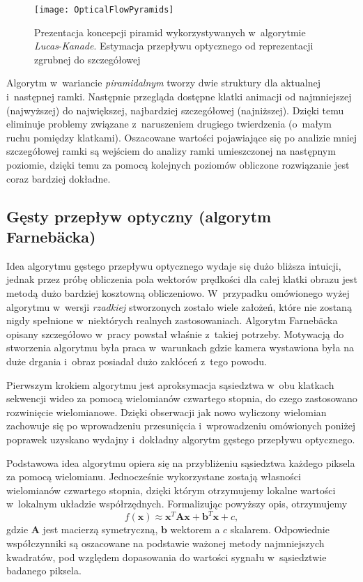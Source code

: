     \begin{figure}[!ht]
      \centering
      \texttt{[image: OpticalFlowPyramids]}
      \caption[Prezentacja koncepcji piramid wykorzystywanych w~algorytmie \textit{Lucas}-\textit{Kanade}]{Prezentacja koncepcji piramid wykorzystywanych w~algorytmie \textit{Lucas}-\textit{Kanade}. Estymacja przepływu optycznego od reprezentacji zgrubnej do szczegółowej}
      \label{fig:OpticalFlowPyramids}
    \end{figure}

    Algorytm w~wariancie \textit{piramidalnym} tworzy dwie struktury dla aktualnej i~następnej ramki. Następnie przegląda dostępne klatki animacji od najmniejszej (najwyższej) do największej, najbardziej szczegółowej (najniższej). Dzięki temu eliminuje problemy związane z~naruszeniem drugiego twierdzenia (o~małym ruchu pomiędzy klatkami). Oszacowane wartości pojawiające się po analizie mniej szczegółowej ramki są wejściem do analizy ramki umieszczonej na następnym poziomie, dzięki temu za pomocą kolejnych poziomów obliczone rozwiązanie jest coraz bardziej dokładne.

    \subsection{Gęsty przepływ optyczny (algorytm Farnebäcka)}\label{Subsection_DenseOpticalFlow}
    Idea algorytmu gęstego przepływu optycznego wydaje się dużo bliższa intuicji, jednak przez próbę obliczenia pola wektorów prędkości dla całej klatki obrazu jest metodą dużo bardziej kosztowną obliczeniowo. W~przypadku omówionego wyżej algorytmu w~wersji \textit{rzadkiej} stworzonych zostało wiele założeń, które nie zostaną nigdy spełnione w~niektórych realnych zastosowaniach. Algorytm Farnebäcka opisany szczegółowo w~pracy \cite{GunnarFarneback03} powstał właśnie z~takiej potrzeby. Motywacją do stworzenia algorytmu była praca w~warunkach gdzie kamera wystawiona była na duże drgania i~obraz posiadał dużo zakłóceń z~tego powodu.

    Pierwszym krokiem algorytmu jest aproksymacja sąsiedztwa w~obu klatkach sekwencji wideo za pomocą wielomianów czwartego stopnia, do czego zastosowano rozwinięcie wielomianowe. Dzięki obserwacji jak nowo wyliczony wielomian zachowuje się po wprowadzeniu przesunięcia i~wprowadzeniu omówionych poniżej poprawek uzyskano wydajny i~dokładny algorytm gęstego przepływu optycznego.

    Podstawowa idea algorytmu opiera się na przybliżeniu sąsiedztwa każdego piksela za pomocą wielomianu. Jednocześnie wykorzystane zostają własności wielomianów czwartego stopnia, dzięki którym otrzymujemy lokalne wartości w~lokalnym układzie współrzędnych. Formalizując powyższy opis, otrzymujemy \[ f(\mathbf{x}) \approx \mathbf{x}^{T}\mathbf{A}\mathbf{x} + \mathbf{b}^{T}\mathbf{x} + c, \] gdzie $\mathbf{A}$ jest macierzą symetryczną, $\mathbf{b}$ wektorem a $c$ skalarem. Odpowiednie współczynniki są oszacowane na podstawie ważonej metody najmniejszych kwadratów, pod względem dopasowania do wartości sygnału w~sąsiedztwie badanego piksela.

